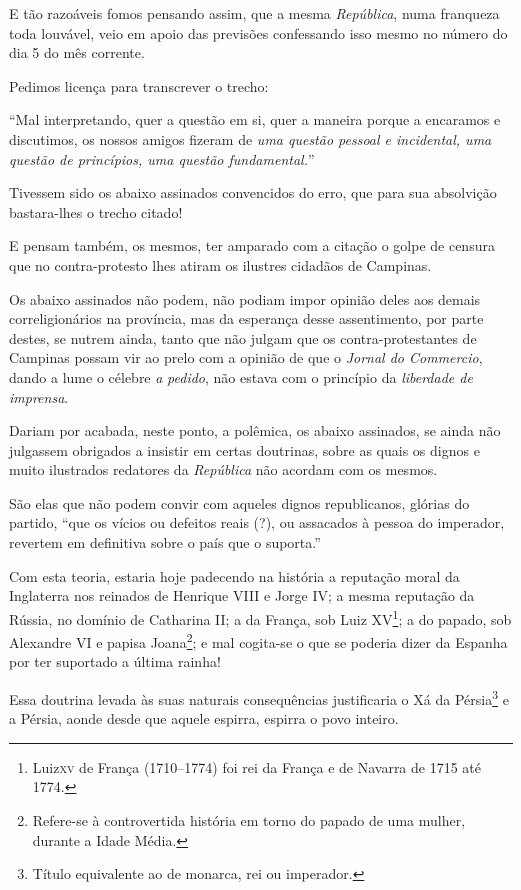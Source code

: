 E tão razoáveis fomos pensando assim, que a mesma \emph{República}, numa
franqueza toda louvável, veio em apoio das previsões confessando isso
mesmo no número do dia 5 do mês corrente.

Pedimos licença para transcrever o trecho:

``Mal interpretando, quer a questão em si, quer a maneira porque a
encaramos e discutimos, os nossos amigos fizeram de \emph{uma questão
pessoal e incidental, uma questão de princípios, uma questão
fundamental.}''

Tivessem sido os abaixo assinados convencidos do erro, que para sua
absolvição bastara-lhes o trecho citado!

E pensam também, os mesmos, ter amparado com a citação o golpe de
censura que no contra-protesto lhes atiram os ilustres cidadãos de
Campinas.

Os abaixo assinados não podem, não podiam impor opinião deles aos demais
correligionários na província, mas da esperança desse assentimento, por
parte destes, se nutrem ainda, tanto que não julgam que os
contra-protestantes de Campinas possam vir ao prelo com a opinião de que
o \emph{Jornal do Commercio}, dando a lume o célebre \emph{a}
\emph{pedido}, não estava com o princípio da \emph{liberdade de
imprensa}.

Dariam por acabada, neste ponto, a polêmica, os abaixo assinados, se
ainda não julgassem obrigados a insistir em certas doutrinas, sobre as
quais os dignos e muito ilustrados redatores da \emph{República} não
acordam com os mesmos.

São elas que não podem convir com aqueles dignos republicanos, glórias
do partido, ``que os vícios ou defeitos reais (?), ou assacados à pessoa
do imperador, revertem em definitiva sobre o país que o suporta.''

Com esta teoria, estaria hoje padecendo na história a reputação moral da
Inglaterra nos reinados de Henrique VIII e Jorge IV; a mesma reputação
da Rússia, no domínio de Catharina II; a da França, sob Luiz
XV\footnote{ Luiz\textsc{xv} de França (1710--1774) foi rei da França e de
  Navarra de 1715 até 1774.}; a do papado, sob Alexandre VI e papisa
Joana\footnote{ Refere-se à controvertida história em torno do papado
  de uma mulher, durante a Idade Média.}; e mal cogita-se o que se
poderia dizer da Espanha por ter suportado a última rainha!

Essa doutrina levada às suas naturais consequências justificaria o Xá da
Pérsia\footnote{ Título equivalente ao de monarca, rei ou imperador.} e
a Pérsia, aonde desde que aquele espirra, espirra o povo inteiro.

